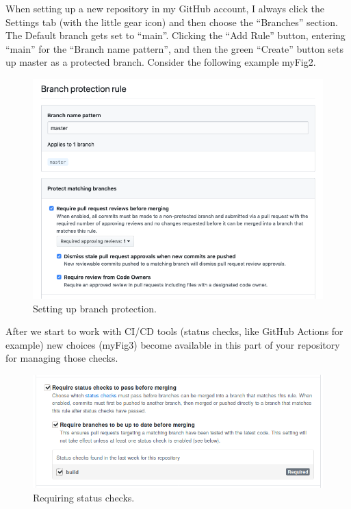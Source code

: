 \justify{}
When setting up a new repository in my GitHub account, I always click
the Settings tab (with the little gear icon) and then choose the
``Branches'' section. The Default branch gets set to ``main''. Clicking
the ``Add Rule'' button, entering ``main'' for the ``Branch name pattern'',
and then the green ``Create'' button sets up master as a protected branch.
Consider the following example {myFig2}.
\begin{figure}
      \includegraphics[scale=0.50]{images/github-branch-protection.png}
      \caption{Setting up branch protection.}
      \label{branchprotect}
\end{figure}

\justify{}
After we start to work with CI/CD tools (status checks, like GitHub Actions for example) new choices ({myFig3}) become
available in this part of your repository for managing those checks.

\begin{figure}
      \includegraphics[scale=0.53]{images/guthub-status-check.png}
      \caption{Requiring status checks.}
      \label{statuscheck}
\end{figure}

